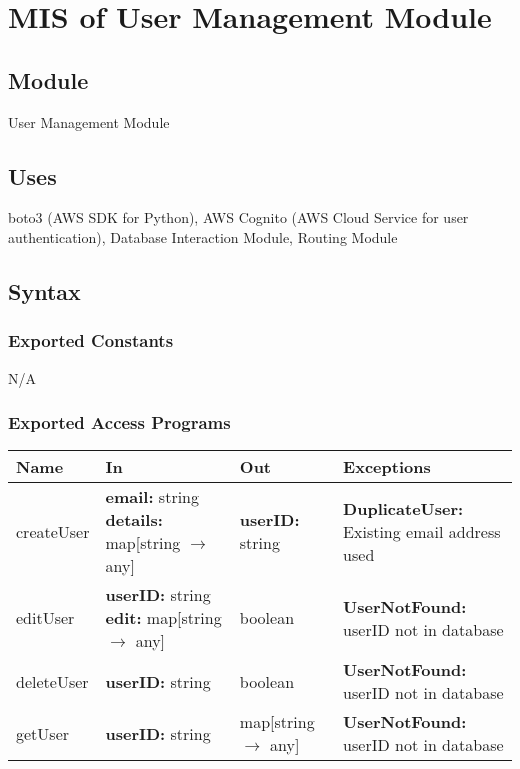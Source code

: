 \documentclass[12pt, titlepage]{article}
\begin{document}
\section{MIS of User Management Module} \label{Module}

\subsection{Module}

User Management Module

\subsection{Uses}

boto3 (AWS SDK for Python), AWS Cognito (AWS Cloud Service for user
authentication), Database Interaction Module, Routing Module

\subsection{Syntax}

\subsubsection{Exported Constants}

N/A

\subsubsection{Exported Access Programs}

\begin{center}
  \begin{tabular}{>{\raggedright}p{2.5cm} >{\raggedright}p{3.5cm}
    >{\raggedright}p{3.5cm} p{5cm}}
    \hline
    \textbf{Name} & \textbf{In} & \textbf{Out} & \textbf{Exceptions} \\
    \hline
    createUser & \textbf{email:} string \newline
    \textbf{details:} map[string $\rightarrow$ any] & \textbf{userID:} string &
    \textbf{DuplicateUser:} Existing email address used \\
    \hline
    editUser & \textbf{userID:} string \newline
    \textbf{edit:} map[string $\rightarrow$ any] & boolean &
    \textbf{UserNotFound:}
    userID not in database \\
    \hline
    deleteUser & \textbf{userID:} string & boolean & \textbf{UserNotFound:}
    userID not in database \\
    \hline
    getUser & \textbf{userID:} string & map[string $\rightarrow$ any]
    & \textbf{UserNotFound:}
    userID not in database \\
    \hline
  \end{tabular}
\end{center}
\end{document}
